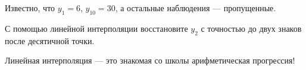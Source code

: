 
\begin{question}
Известно, что \(y_1 = 6\), \(y_{10} = 30\), а остальные наблюдения --- пропущенные.

С помощью линейной интерполяции восстановите \(y_{2}\) с точностью до двух знаков после десятичной точки.
\end{question}

\begin{solution}
Линейная интерполяция --- это знакомая со школы арифметическая прогрессия!
\end{solution}

